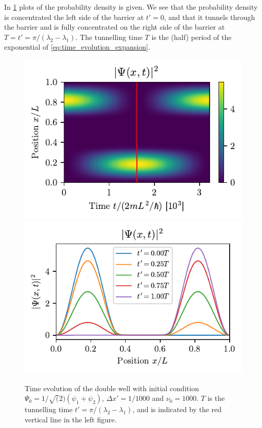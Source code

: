 In \cref{fig:double_well_solutions} plots of the probability density is given. We see that the probability density is concentrated the left side of the barrier at $t'=0$, and that it tunnels through the barrier and is fully concentrated on the right side of the barrier at $T = t' = \pi/(\lambda_2 - \lambda_1)$. The tunnelling time $T$ is the (half) period of the exponential of \cref{eq:time_evolution_expansion}.
\begin{figure}[ht!]%
\centering%
\includegraphics{figs/double_twopsi_prob.pdf}%
\includegraphics{figs/double_twopsi_prob_1d.pdf}%
\caption{Time evolution of the double well with initial condition $\Psi_0 = 1/\sqrt(2)(\psi_1 + \psi_2)$, $\Delta x' = 1/1000$ and $\nu_0 = 1000$. $T$ is the tunnelling time $t' = \pi/(\lambda_2 - \lambda_1)$, and is indicated by the red vertical line in the left figure. \label{fig:double_well_solutions}}%
\end{figure}

